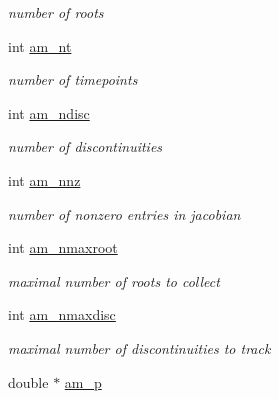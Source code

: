 \begin{DoxyCompactItemize}
\begin{DoxyCompactList}\small\item\em number of roots \end{DoxyCompactList}\item 
\hypertarget{struct_user_data_a08ea6ecb241cd86a6f171761a48e27dd}{}int \hyperlink{struct_user_data_a08ea6ecb241cd86a6f171761a48e27dd}{am\+\_\+nt}\label{struct_user_data_a08ea6ecb241cd86a6f171761a48e27dd}

\begin{DoxyCompactList}\small\item\em number of timepoints \end{DoxyCompactList}\item 
\hypertarget{struct_user_data_adc94a5ce0a5314355aae8e05060c13da}{}int \hyperlink{struct_user_data_adc94a5ce0a5314355aae8e05060c13da}{am\+\_\+ndisc}\label{struct_user_data_adc94a5ce0a5314355aae8e05060c13da}

\begin{DoxyCompactList}\small\item\em number of discontinuities \end{DoxyCompactList}\item 
\hypertarget{struct_user_data_a43ad1c7f840dc744be4251902a4ae91d}{}int \hyperlink{struct_user_data_a43ad1c7f840dc744be4251902a4ae91d}{am\+\_\+nnz}\label{struct_user_data_a43ad1c7f840dc744be4251902a4ae91d}

\begin{DoxyCompactList}\small\item\em number of nonzero entries in jacobian \end{DoxyCompactList}\item 
\hypertarget{struct_user_data_a2c6b0a170bd534f68ab5b216629055a8}{}int \hyperlink{struct_user_data_a2c6b0a170bd534f68ab5b216629055a8}{am\+\_\+nmaxroot}\label{struct_user_data_a2c6b0a170bd534f68ab5b216629055a8}

\begin{DoxyCompactList}\small\item\em maximal number of roots to collect \end{DoxyCompactList}\item 
\hypertarget{struct_user_data_a57c79c232bf5d88b7dd1b3cb5947366b}{}int \hyperlink{struct_user_data_a57c79c232bf5d88b7dd1b3cb5947366b}{am\+\_\+nmaxdisc}\label{struct_user_data_a57c79c232bf5d88b7dd1b3cb5947366b}

\begin{DoxyCompactList}\small\item\em maximal number of discontinuities to track \end{DoxyCompactList}\item 
\hypertarget{struct_user_data_a1a679b0e8dfea7d284d777c937d8d13e}{}double $\ast$ \hyperlink{struct_user_data_a1a679b0e8dfea7d284d777c937d8d13e}{am\+\_\+p}\label{struct_user_data_a1a679b0e8dfea7d284d777c937d8d13e}


\end{DoxyCompactItemize}
